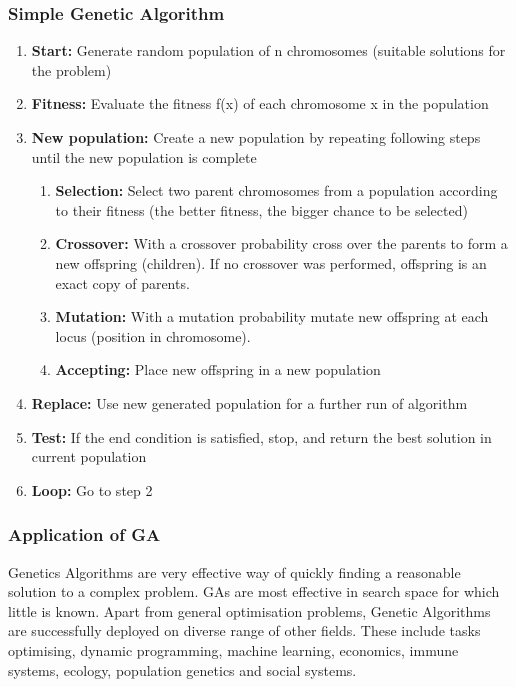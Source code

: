 \subsubsection{Simple Genetic Algorithm}
\begin{enumerate}
\item \textbf{Start:} Generate random population of n chromosomes (suitable solutions for the problem)
\item \textbf{Fitness:} Evaluate the fitness f(x) of each chromosome x in the population
\item \textbf{New population:} Create a new population by repeating following steps until the new population is complete
	\begin{enumerate}
	\item \textbf{Selection:} Select two parent chromosomes from a population according to their fitness (the better fitness, the bigger chance to be selected)
	\item \textbf{Crossover:} With a crossover probability cross over the parents to form a new offspring (children). If no crossover was performed, offspring is an exact copy of parents.
	\item \textbf{Mutation:} With a mutation probability mutate new offspring at each locus (position in chromosome).
	\item \textbf{Accepting:} Place new offspring in a new population
	\end{enumerate}
\item \textbf{Replace:} Use new generated population for a further run of algorithm
\item \textbf{Test:} If the end condition is satisfied, stop, and return the best solution in current population
\item \textbf{Loop:} Go to step 2
\end{enumerate}
\citep{Obitko:98}

\subsubsection{Application of GA}
Genetics Algorithms are very effective way of quickly finding a reasonable solution to a complex problem. GAs are most effective in search space for which little is known. Apart from general optimisation problems, Genetic Algorithms are successfully deployed on diverse range of other fields. These include tasks optimising, dynamic programming, machine learning, economics, immune systems, ecology, population genetics and social systems. \citep{Murphy:03}


